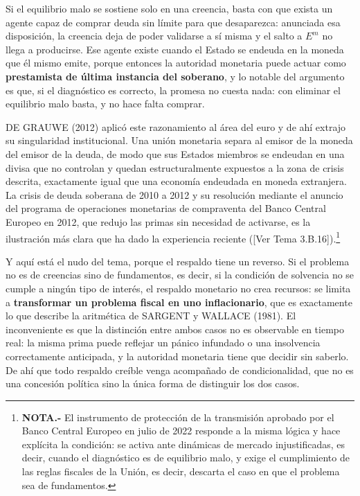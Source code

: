 \documentclass[10pt,a4paper]{article}
\newcommand{\authorfont}[1]{{\fontfamily{EBGaramond-TLF}\selectfont #1}}
\begin{document}
Si el equilibrio malo se sostiene solo en una creencia, basta con que exista un agente capaz de comprar deuda sin límite para que desaparezca: anunciada esa disposición, la creencia deja de poder validarse a sí misma y el salto a $E^{m}$ no llega a producirse. Ese agente existe cuando el Estado se endeuda en la moneda que él mismo emite, porque entonces la autoridad monetaria puede actuar como \textbf{prestamista de última instancia del soberano}, y lo notable del argumento es que, si el diagnóstico es correcto, la promesa no cuesta nada: con eliminar el equilibrio malo basta, y no hace falta comprar.

DE GRAUWE (2012) aplicó este razonamiento al área del euro y de ahí extrajo su singularidad institucional. Una unión monetaria separa al emisor de la moneda del emisor de la deuda, de modo que sus Estados miembros se endeudan en una divisa que no controlan y quedan estructuralmente expuestos a la zona de crisis descrita, exactamente igual que una economía endeudada en moneda extranjera. La crisis de deuda soberana de 2010 a 2012 y su resolución mediante el anuncio del programa de operaciones monetarias de compraventa del Banco Central Europeo en 2012, que redujo las primas sin necesidad de activarse, es la ilustración más clara que ha dado la experiencia reciente ([\authorfont{Ver Tema 3.B.16}]).\footnote{%
    \textbf{NOTA.-} El instrumento de protección de la transmisión aprobado por el Banco Central Europeo en julio de 2022 responde a la misma lógica y hace explícita la condición: se activa ante dinámicas de mercado injustificadas, es decir, cuando el diagnóstico es de equilibrio malo, y exige el cumplimiento de las reglas fiscales de la Unión, es decir, descarta el caso en que el problema sea de fundamentos.
}

Y aquí está el nudo del tema, porque el respaldo tiene un reverso. Si el problema no es de creencias sino de fundamentos, es decir, si la condición de solvencia no se cumple a ningún tipo de interés, el respaldo monetario no crea recursos: se limita a \textbf{transformar un problema fiscal en uno inflacionario}, que es exactamente lo que describe la aritmética de SARGENT y WALLACE (1981). El inconveniente es que la distinción entre ambos casos no es observable en tiempo real: la misma prima puede reflejar un pánico infundado o una insolvencia correctamente anticipada, y la autoridad monetaria tiene que decidir sin saberlo. De ahí que todo respaldo creíble venga acompañado de condicionalidad, que no es una concesión política sino la única forma de distinguir los dos casos.
\end{document}

